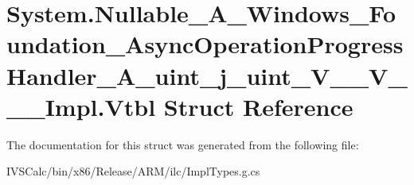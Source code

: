 \hypertarget{struct_system_1_1_nullable___a___windows___foundation___async_operation_progress_handler___a__ui133ff2d549e63e5534934a9db607e16e}{}\section{System.\+Nullable\+\_\+\+A\+\_\+\+Windows\+\_\+\+Foundation\+\_\+\+Async\+Operation\+Progress\+Handler\+\_\+\+A\+\_\+uint\+\_\+j\+\_\+uint\+\_\+\+V\+\_\+\+\_\+\+V\+\_\+\+\_\+\+\_\+\+Impl.\+Vtbl Struct Reference}
\label{struct_system_1_1_nullable___a___windows___foundation___async_operation_progress_handler___a__ui133ff2d549e63e5534934a9db607e16e}


The documentation for this struct was generated from the following file\+:\begin{DoxyCompactItemize}
\item 
I\+V\+S\+Calc/bin/x86/\+Release/\+A\+R\+M/ilc/Impl\+Types.\+g.\+cs\end{DoxyCompactItemize}
